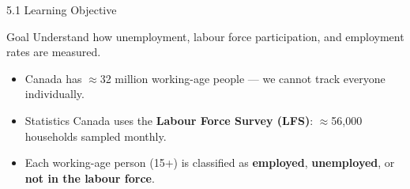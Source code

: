 \documentclass[aspectratio=169]{beamer}
\begin{document}
\begin{frame}{5.1 Learning Objective}
\transfade
\begin{block}{Goal}
Understand how unemployment, labour force participation, and employment rates are measured.
\end{block}
\begin{itemize}[<+->]
  \item Canada has $\approx$32 million working-age people --- we cannot track everyone individually.
  \item Statistics Canada uses the \textbf{Labour Force Survey (LFS)}: $\approx$56,000 households sampled monthly.
  \item Each working-age person (15+) is classified as \textbf{employed}, \textbf{unemployed}, or \textbf{not in the labour force}.
\end{itemize}
\end{frame}
\end{document}
